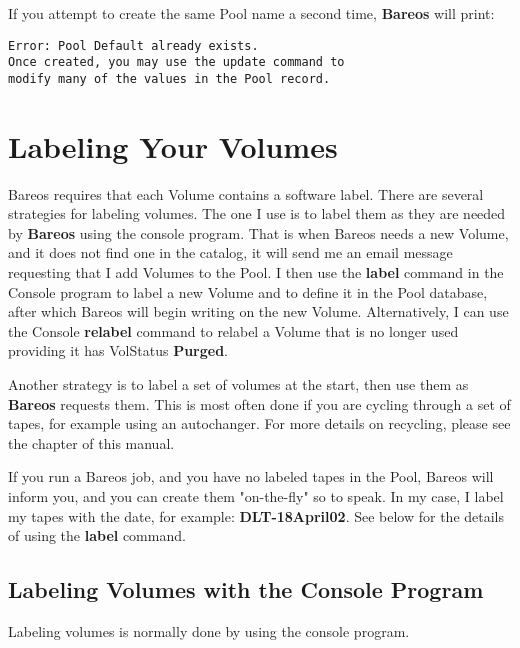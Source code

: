If you attempt to create the same Pool name a second time, {\bf Bareos} will
print:

\footnotesize
\begin{verbatim}
Error: Pool Default already exists.
Once created, you may use the update command to
modify many of the values in the Pool record.
\end{verbatim}
\normalsize


\section{Labeling Your Volumes}
\label{Labeling}

Bareos requires that each Volume contains a software label. There are several
strategies for labeling volumes. The one I use is to label them as they are
needed by {\bf Bareos} using the console program. That is when Bareos needs a
new Volume, and it does not find one in the catalog, it will send me an email
message requesting that I add Volumes to the Pool. I then use the {\bf label}
command in the Console program to label a new Volume and to define it in the
Pool database, after which Bareos will begin writing on the new Volume.
Alternatively, I can use the Console {\bf relabel} command to relabel a Volume
that is no longer used providing it has VolStatus {\bf Purged}.

Another strategy is to label a set of volumes at the start, then use them as
{\bf Bareos} requests them. This is most often done if you are cycling through
a set of tapes, for example using an autochanger. For more details on
recycling, please see the
 chapter of
this manual.

If you run a Bareos job, and you have no labeled tapes in the Pool, Bareos
will inform you, and you can create them "on-the-fly" so to speak. In my
case, I label my tapes with the date, for example: {\bf DLT-18April02}. See
below for the details of using the {\bf label} command.

\subsection*{Labeling Volumes with the Console Program}

Labeling volumes is normally done by using the console program.

